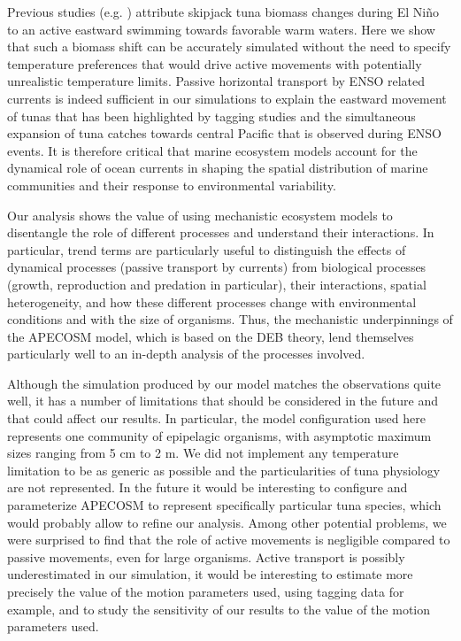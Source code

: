 Previous studies (e.g. \citealp{lehodeyNinoSouthernOscillation1997, lehodeyPelagicEcosystemTropical2001}) attribute skipjack tuna biomass changes during El Niño to an active eastward swimming towards favorable warm waters. Here we show that such a biomass shift can be accurately simulated without the need to specify temperature preferences that would drive active movements with potentially unrealistic temperature limits. Passive horizontal transport by ENSO related currents is indeed sufficient in our simulations to explain the eastward movement of tunas that has been highlighted by tagging studies and the simultaneous expansion of tuna catches towards central Pacific that is observed during ENSO events. It is therefore critical that marine ecosystem models account for the dynamical role of ocean currents in shaping the spatial distribution of marine communities and their response to environmental variability.

Our analysis shows the value of using mechanistic ecosystem models to disentangle the role of different processes and understand their interactions. In particular, trend terms are particularly useful to distinguish the effects of dynamical processes (passive transport by currents) from biological processes (growth, reproduction and predation in particular), their interactions, spatial heterogeneity, and how these different processes change with environmental conditions and with the size of organisms. Thus, the mechanistic underpinnings of the APECOSM model, which is based on the DEB theory, lend themselves particularly well to an in-depth analysis of the processes involved.

Although the simulation produced by our model matches the observations quite well, it has a number of limitations that should be considered in the future and that could affect our results. In particular, the model configuration used here represents one community of epipelagic organisms, with asymptotic maximum sizes ranging from 5 cm to 2 m. We did not implement any temperature limitation to be as generic as possible and the particularities of tuna physiology are not represented. In the future it would be interesting to configure and parameterize APECOSM to represent specifically particular tuna species, which would probably allow to refine our analysis. Among other potential problems, we were surprised to find that the role of active movements is negligible compared to passive movements, even for large organisms. Active transport is possibly underestimated in our simulation, it would be interesting to estimate more precisely the value of the motion parameters used, using tagging data for example, and to study the sensitivity of our results to the value of the motion parameters used.

